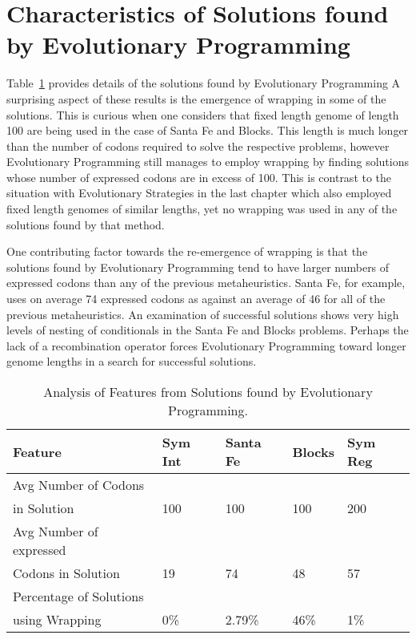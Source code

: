 \section{Characteristics of Solutions found by Evolutionary Programming}

Table~\ref{ep_results_analysis_table} provides details of the solutions found by Evolutionary Programming A surprising aspect of these results is the emergence of wrapping in some of the solutions. This is curious when one considers that fixed length genome of length 100 are being used in the case of Santa Fe and Blocks. This length is much longer than the number of codons required to solve the respective problems, however Evolutionary Programming still manages to employ wrapping by finding solutions whose number of expressed codons are in excess of 100. This is contrast to the situation with Evolutionary Strategies in the last chapter which also employed fixed length genomes of similar lengths, yet no wrapping was used in any of the solutions found by that method. 

One contributing factor towards the re-emergence of wrapping is that the solutions found by Evolutionary Programming tend to have larger numbers of expressed codons than any of the previous metaheuristics. Santa Fe, for example, uses on average 74 expressed codons as against an average of 46 for all of the previous metaheuristics. An examination of successful solutions shows very high levels of nesting of conditionals in the Santa Fe and Blocks problems. Perhaps the lack of a recombination operator forces Evolutionary Programming toward longer genome lengths in a search for successful solutions.

\begin{table}[h]
\begin{center}
\begin{tabular}{|l|l|l|l|l|}
\hline
Feature & Sym Int & Santa Fe & Blocks & Sym Reg  \\
\hline
Avg Number of Codons & & & &  \\ 
in Solution & 100 & 100 & 100 & 200  \\
Avg Number of expressed & & & &  \\
Codons in Solution & 19 & 74 & 48 & 57 \\
Percentage of Solutions & & & &  \\
using Wrapping & 0\% & 2.79\% & 46\% & 1\% \\
\hline
\end{tabular}
\caption{\label{ep_results_analysis_table} Analysis of Features from Solutions found by Evolutionary Programming.}
\end{center}
\end{table}



